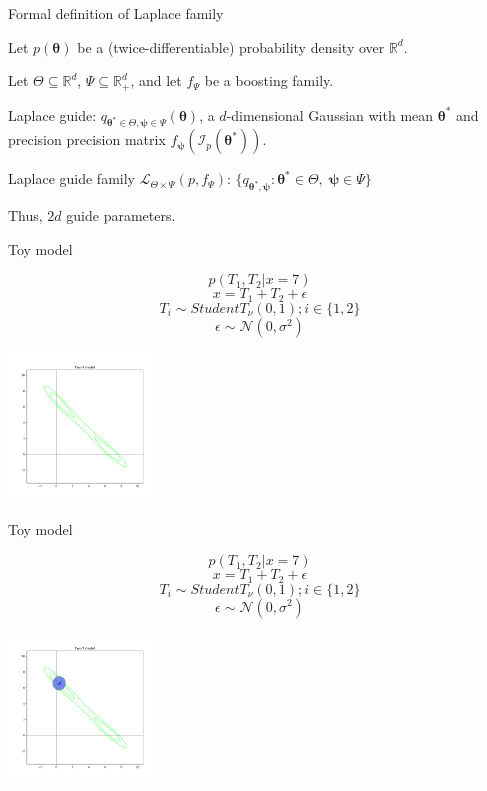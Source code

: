 \documentclass[
  ignorenonframetext,
]{beamer}
\begin{document}
\begin{frame}{Formal definition of Laplace family}
\protect\hypertarget{formal-definition-of-laplace-family}{}

Let \(p(\bm{\theta})\) be a (twice-differentiable) probability density
over \(\mathbb{R}^d\).

Let \(\Theta \subseteq \mathbb{R}^d\),
\(\Psi \subseteq \mathbb{R}^d_+\), and let \(f_\Psi\) be a boosting
family.

Laplace guide:
\(q_{\bm{\theta}^*\in\Theta,\bm{\psi}\in\Psi}(\bm{\theta})\), a
\(d\)-dimensional Gaussian with mean \(\bm{\theta}^*\) and precision
precision matrix
\(f_{\bm{\psi}} \left(\mathcal{I}_p(\bm{\theta}^*)\right)\).

Laplace guide family \(\mathcal{L}_{\Theta\times\Psi} (p,f_\Psi)\):
\(\{q_{\bm{\theta}^*,\bm{\psi}}:\bm{\theta}^*\in\Theta,\;\bm{\psi}\in\Psi\}\)

Thus, \(2d\) guide parameters.

\end{frame}

\begin{frame}{Toy model}
\protect\hypertarget{toy-model}{}

\[p(T_1,T_2|x=7)\] \[x= T_1+T_2+\epsilon\]
\[T_i\sim StudentT_{\nu}(0,1); i\in\{1,2\}\]
\[\epsilon\sim \mathcal{N}(0,\sigma^2)\]

\begin{center}\includegraphics[width=150px]{beforemeanfield} \end{center}

\end{frame}

\begin{frame}{Toy model}
\protect\hypertarget{toy-model-1}{}

\[p(T_1,T_2|x=7)\] \[x= T_1+T_2+\epsilon\]
\[T_i\sim StudentT_{\nu}(0,1); i\in\{1,2\}\]
\[\epsilon\sim \mathcal{N}(0,\sigma^2)\]

\begin{center}\includegraphics[width=150px]{beforelaplace} \end{center}

\end{frame}
\end{document}

